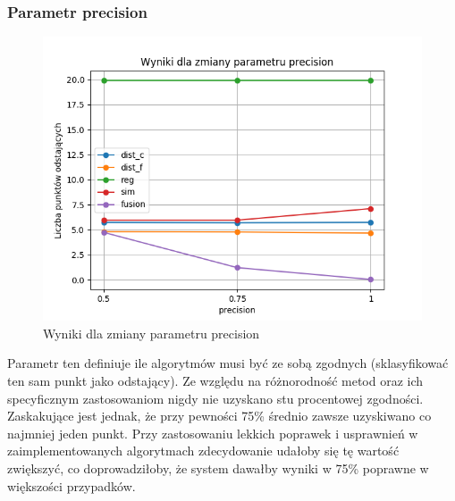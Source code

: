 \documentclass[eng,printmode]{mgr}
\begin{document}
\subsubsection{Parametr precision}
\begin{figure}[H]
  \begin{center}
  \includegraphics[scale=0.7]{avg_precision}
  \end{center}
  \caption{Wyniki dla zmiany parametru precision}
  \label{fig:avg_precision}
\end{figure}
Parametr ten definiuje ile algorytmów musi być ze sobą zgodnych (sklasyfikować ten sam punkt jako odstający). Ze względu na różnorodność metod oraz ich specyficznym zastosowaniom nigdy nie uzyskano stu procentowej zgodności. Zaskakujące jest jednak, że przy pewności 75\% średnio zawsze uzyskiwano co najmniej jeden punkt. Przy zastosowaniu lekkich poprawek i usprawnień w zaimplementowanych algorytmach zdecydowanie udałoby się tę wartość zwiększyć, co doprowadziłoby, że system dawałby wyniki w 75\% poprawne w większości przypadków.
\end{document}
